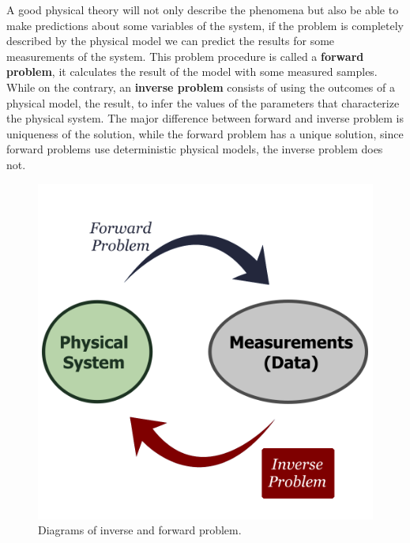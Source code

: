 \begin{minipage}{0.5\linewidth}
A good physical theory will not only describe the phenomena but also be able to make predictions about some variables of the system, if the problem is completely described by the physical model we can predict the results for some measurements of the system. This problem procedure is called a \textbf{forward problem}, it calculates the result of the model with some measured samples. While on the contrary, an \textbf{inverse problem} consists of using the outcomes of a physical model, the result, to infer the values of the parameters that characterize the physical system. The major difference between forward and inverse problem is uniqueness of the solution, while the forward problem has a unique solution, since forward problems use deterministic physical models, the inverse problem does not. \cite{inverse_problem}
\end{minipage}\hspace{20pt}
\begin{minipage}{0.45\linewidth}
\begin{figure}[H]
    \centering
    \includegraphics[width=\linewidth]{Images/invers_problem.png}
    \caption{Diagrams of inverse and forward problem.}
    \label{fig:inverse_problem}
\end{figure}
\end{minipage}
\vspace{10pt}

